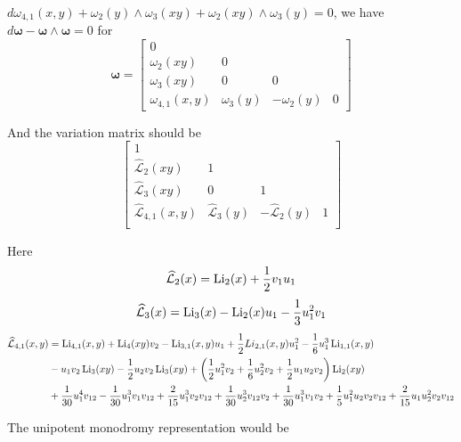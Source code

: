 \documentclass[main]{subfiles}
\begin{document}
$d\omega_{4,1}(x,y)+\omega_{2}(y)\wedge\omega_{3}(xy)+\omega_{2}(xy)\wedge\omega_3(y)=0$, we have $d\bm{\omega}-\bm{\omega}\wedge\bm{\omega}=0$ for
\[\bm{\omega}=\begin{bmatrix}
0\\
\omega_{2}(xy)&0\\
\omega_{3}(xy)&0&0\\
\omega_{4,1}(x,y)&\omega_3(y)&-\omega_2(y)&0
\end{bmatrix}\]

And the variation matrix should be
\[
\begin{bmatrix}
1\\
\widehat{\mathcal L}_{2}(xy)&1\\
\widehat{\mathcal L}_{3}(xy)&0&1\\
\widehat{\mathcal L}_{4,1}(x,y)&\widehat{\mathcal L}_3(y)&-\widehat{\mathcal L}_2(y)&1\\
\end{bmatrix}
\]

Here
\[\widehat{\mathcal L}_{2}(x)=\operatorname{Li}_{2}(x)+\frac{1}{2}v_1u_1\]
\[\widehat{\mathcal L}_{3}(x)=\operatorname{Li}_{3}(x)-\operatorname{Li}_2(x)u_1-\frac{1}{3}u_1^2v_1\]
\begin{align*}
\widehat{\mathcal L}_{4,1}(x,y)&=\operatorname{Li}_{4,1}(x,y)+\operatorname{Li}_4(xy)v_2-\operatorname{Li}_{3,1}(x,y)u_1+\frac{1}{2}Li_{2,1}(x,y)u_1^2-\frac{1}{6}u_1^3\operatorname{Li}_{1,1}(x,y) \\
&-u_1v_2\operatorname{Li}_3(xy)-\frac{1}{2}u_2v_2\operatorname{Li}_3(xy)+\left(\frac{1}{2} u_1^2 v_2 + \frac{1}{6} u_2^2 v_2 + \frac{1}{2} u_1 u_2 v_2\right)\operatorname{Li}_{2}(xy) \\
&+\frac{1}{30} u_1^4 v_{12} - \frac{1}{30} u_1^3 v_1 v_{12} + \frac{2}{15} u_1^3 v_2 v_{12} + 
  \frac{1}{30} u_2^3 v_{12} v_2 + \frac{1}{30} u_1^3 v_1 v_2 + \frac{1}{5} u_1^2 u_2 v_2 v_{12} + 
  \frac{2}{15} u_1 u_2^2 v_2 v_{12}
\end{align*}

The unipotent monodromy representation would be
\end{document}
